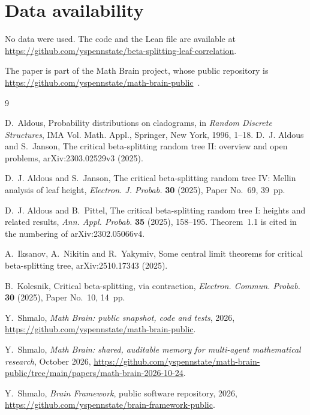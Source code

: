 \documentclass[11pt]{amsart}
\theoremstyle{remark}
\numberwithin{equation}{section}
\begin{document}
\section*{Data availability}
No data were used. The code and the Lean file are available at\\ \url{https://github.com/yspennstate/beta-splitting-leaf-correlation}.

The paper is part of the Math Brain project, whose public repository is \url{https://github.com/yspennstate/math-brain-public}~\cite{MathBrainRepo}.

\begin{thebibliography}{9}

D.~Aldous, Probability distributions on cladograms, in \emph{Random Discrete Structures}, IMA Vol. Math. Appl., Springer, New York, 1996, 1--18.
D.~J. Aldous and S.~Janson, The critical beta-splitting random tree II: overview and open problems, arXiv:2303.02529v3 (2025).

D.~J. Aldous and S.~Janson, The critical beta-splitting random tree IV: Mellin analysis of leaf height, \emph{Electron. J. Probab.} \textbf{30} (2025), Paper No.~69, 39~pp.

D.~J. Aldous and B.~Pittel, The critical beta-splitting random tree I: heights and related results, \emph{Ann. Appl. Probab.} \textbf{35} (2025), 158--195. Theorem~1.1 is cited in the numbering of arXiv:2302.05066v4.

A.~Iksanov, A.~Nikitin and R.~Yakymiv, Some central limit theorems for critical beta-splitting tree, arXiv:2510.17343 (2025).

B.~Kolesnik, Critical beta-splitting, via contraction, \emph{Electron. Commun. Probab.} \textbf{30} (2025), Paper No.~10, 14~pp.

 Y.~Shmalo, \emph{Math Brain: public snapshot, code and tests}, 2026, \url{https://github.com/yspennstate/math-brain-public}.

 Y.~Shmalo, \emph{Math Brain: shared, auditable memory for multi-agent mathematical research}, October 2026, \url{https://github.com/yspennstate/math-brain-public/tree/main/papers/math-brain-2026-10-24}.

 Y.~Shmalo, \emph{Brain Framework}, public software repository, 2026, \url{https://github.com/yspennstate/brain-framework-public}.

\end{thebibliography}
\end{document}
